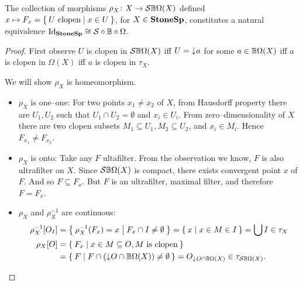 \begin{proposition}
    The collection of morphisms $\rho_X\colon X \to \mathcal{S}\mathbb{B}\Omega(X)$ defined $x \mapsto F_x = \Set{U\text{ clopen} | x\in U }$, for $X \in \mathbf{StoneSp}$, constitutes a natural equivalence $\operatorname{Id}_{\mathbf{StoneSp}} \cong \mathcal{S}\circ\mathbb{B}\circ\Omega$.
\end{proposition}
\begin{proof}
    First observe $U$ is clopen in $\mathcal{S}\mathbb{B}\Omega(X)$ iff $U = \mathord{\downarrow}\mkern1mu a$ for some $a \in \mathbb{B}\Omega(X)$ iff $a$ is clopen in $\Omega(X)$ iff $a$ is clopen in $\tau_X$.

    We will show $\rho_X$ is homeomorphism.
    \begin{itemize}
        \item $\rho_X$ is one--one: For two points $x_1 \neq x_2$ of $X$, from Hausdorff property there are $U_1, U_2$ such that $U_1\cap U_2 = \emptyset$ and $x_i\in U_i$. From zero--dimensionality of $X$ there are two clopen subsets $M_1 \subseteq U_1, M_2 \subseteq U_2$, and $x_i \in M_i$. Hence $F_{x_1} \neq F_{x_2}$.

        \item $\rho_X$ is onto: Take any $F$ ultafilter. From the observation we know, $F$ is also ultrafilter on $X$. Since $\mathcal{S}\mathbb{B}\Omega(X)$ is compact, there exists convergent point $x$ of $F$. And so $F \subseteq F_x$. But $F$ is an ultrafilter, maximal filter, and therefore $F = F_x$.

        \item $\rho_X$ and $\rho_X^{-1}$ are continuous:
        \begin{align*}
            \rho_X^{-1}[O_I] &= \Set{ \rho_X^{-1}(F_x) = x | F_x \cap I \neq \emptyset} 
                = \Set{ x | x \in M \in I } = \bigcup I \in \tau_X \\
            \rho_X[O] &= \Set{ F_x | x \in M \subseteq O, M \text{ is clopen}} \\
                      &= \Set{ F | F \cap (\mathord{\downarrow}\mkern1muO \cap \ensuremath{\mathbb{B}}\Omega(X)) \neq \emptyset} = O_{\mathord{\downarrow}\mkern1mu O \cap \mathbb{B}\Omega(X)} \in \tau_{\mathcal{S}\mathbb{B}\Omega(X)}.
        \end{align*}
    \end{itemize}


\end{proof}
